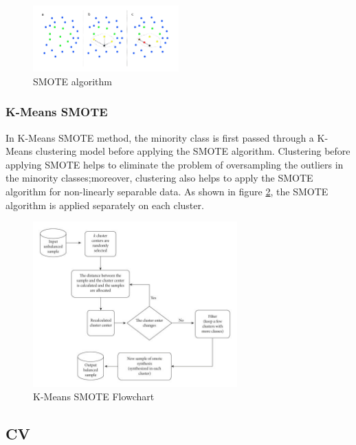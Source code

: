 \documentclass[twoside,11pt,a4paper]{article}
\begin{document}
\begin{figure}[ht]
	\centering
	\includegraphics[width=0.5\textwidth]{smote}
	\caption[\acs{SMOTE} algorithm]{\acs{SMOTE} algorithm \citep{schubachimbalance}}
	\label{fig:smote}
\end{figure}
\FloatBarrier
\subsubsection{K-Means \acs{SMOTE}}

In K-Means \acs{SMOTE} method, the minority class is first passed through a K-Means clustering model before applying the \acs{SMOTE} algorithm. Clustering before applying \acs{SMOTE} helps to eliminate the problem of oversampling the outliers in the minority classes;moreover, clustering also helps to apply the \acs{SMOTE} algorithm for non-linearly separable data. As shown in  figure \ref{fig:kmeans_smote}, the SMOTE algorithm is applied separately on each cluster.\\
\begin{figure}[ht]
	\centering
	\includegraphics[width=0.7\textwidth]{kmeans_smote}
	\caption[K-Means \acs{SMOTE} algorithm]{K-Means \acs{SMOTE} Flowchart \citep{chen2021research}}
	\label{fig:kmeans_smote}
\end{figure}
\FloatBarrier
\subsection{\acf{CV}}
\end{document}
